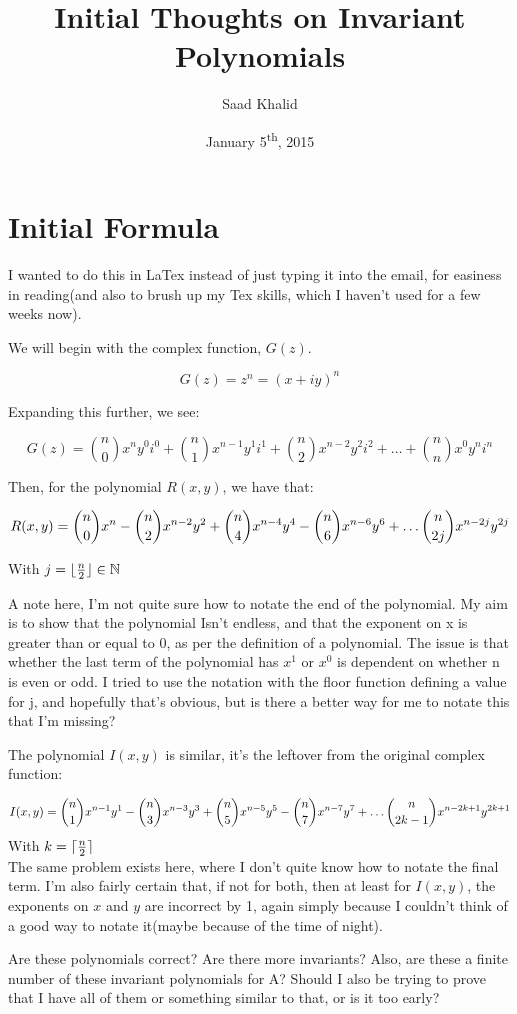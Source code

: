 \documentclass[12pt]{article}
\DeclarePairedDelimiter{\floor}{\lfloor}{\rfloor}
\DeclarePairedDelimiter{\ceil}{\lceil}{\rceil}
\begin{document}
\title{Initial Thoughts on Invariant Polynomials}
\author{Saad Khalid}
\date{January 5\textsuperscript{th}, 2015}
\maketitle

\section*{Initial Formula}

I wanted to do this in LaTex instead of just typing it into the email, for easiness in reading(and also to brush up my Tex skills, which I haven't used for a few weeks now).

We will begin with the complex function, $G(z)$.

\[ 
	G(z) = z^n = (x + iy)^n 
\]

Expanding this further, we see:

\[
       	G(z) =  \binom{n}{0} x^ny^0i^0 +\binom{n}{1} x^{n-1}y^1i^1 + \binom{n}{2} x^{n-2}y^2i^2 + \ldots + \binom{n}{n} x^0y^ni^n 
\]


Then, for the polynomial $R(x,y)$, we have that:

\[
	R(x,y) = \binom{n}{0}x^n - \binom{n}{2}x^{n-2}y^2 + \binom{n}{4}x^{n-4}y^4 - \binom{n}{6}x^{n-6}y^6 + \ldots \space \binom{n}{2j}x^{n-2j}y^{2j}
\]

       	 With $j = \floor{\frac{n}{2}} \in \mathbb{N}$ 

A note here, I'm not quite sure how to notate the end of the polynomial. My aim is to show that the polynomial Isn't endless, and that the exponent on x is greater than or equal to 0, as per the definition of a polynomial. The issue is that whether the last term of the polynomial has $x^1$ or $x^0$ is dependent on whether n is even or odd. I tried to use the notation with the floor function defining a value for j, and hopefully that's obvious, but is there a better way for me to notate this that I'm missing? 

The polynomial $I(x,y)$ is similar, it's the leftover from the original complex function:

\[
	I(x,y) = \binom{n}{1}x^{n-1}y^1 - \binom{n}{3}x^{n-3}y^3 + \binom{n}{5}x^{n-5}y^5 - \binom{n}{7}x^{n-7}y^7 + \ldots \space \binom{n}{2k-1}x^{n-2k+1}y^{2k+1}
\]
	With $k = \ceil[Bigg]{\frac{n}{2}} $  \\
The same problem exists here, where I don't quite know how to notate the final term. I'm also fairly certain that, if not for both, then at least for $I(x,y)$, the exponents on $x$ and $y$ are incorrect by 1, again simply because I couldn't think of a good way to notate it(maybe because of the time of night).

Are these polynomials correct? Are there more invariants? Also, are these a finite number of these invariant polynomials for A? Should I also be trying to prove that I have all of them or something similar to that, or is it too early? 
\end{document}
